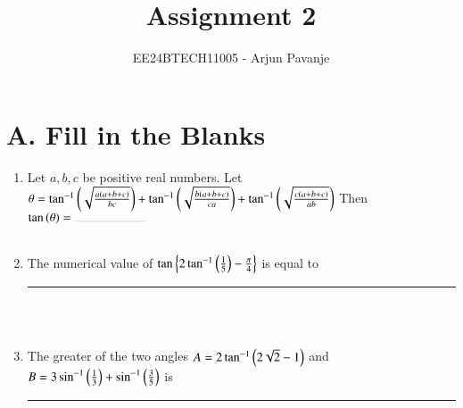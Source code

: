 \documentclass[journal,12pt,twocolumn,article]{IEEEtran}
\theoremstyle{remark}
\begin{document}

\vspace{3cm}

\title{Assignment 2}
\author{EE24BTECH11005 - Arjun Pavanje}
\maketitle
\newpage
\bigskip

\renewcommand{\thefigure}{\theenumi}
\renewcommand{\thetable}{\theenumi}
\section*{A. Fill in the Blanks}
\begin{enumerate}
\item Let $a,b,c$ be positive real numbers. Let
$\theta = \tan ^{-1}\left(\sqrt{\frac{a\left(a+b+c\right)}{bc}}\right) + \tan ^{-1}\left(\sqrt{\frac{b\left(a+b+c\right)}{ca}}\right) + \tan ^{-1}\left(\sqrt{\frac{c\left(a+b+c\right)}{ab}}\right) $
Then $\tan \brak{\theta}= \rule{2cm}{0.1pt}$ 
\hfill {}\\\\
\item The numerical value of $\tan \left\{ 2\tan ^{-1}\left(\frac{1}{5}\right)-\frac{\pi}{4} \right\}$ is equal to \rule{2cm}{0.1pt}
\hfill {}\\\\
\item The greater of the two angles $A = 2 \tan ^{-1}\left(2\sqrt{2}-1\right)$ and $B = 3\sin ^{-1}\left(\frac{1}{3}\right) + \sin ^{-1}\left(\frac{3}{5}\right)$ is \rule{2cm}{0.1pt}
\hfill {}\\\\
\end{enumerate}
\end{document}
